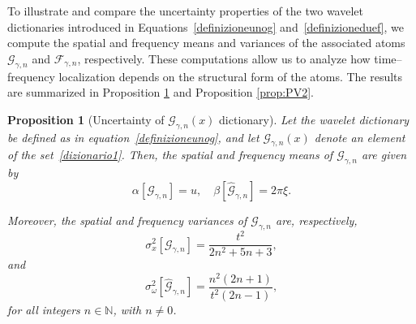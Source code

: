 \documentclass[preprint,hidelinks,authoryear]{elsarticle}
\newtheorem{Prop}[Thm]{Proposition}
\theoremstyle{plain}
\theoremstyle{definition}
\theoremstyle{remark}
\begin{document}
To illustrate and compare the uncertainty properties of the two wavelet dictionaries introduced in Equations~\eqref{definizioneunog} and~\eqref{definizioneduef}, we compute the spatial and frequency means and variances of the associated atoms $ \mathcal{G}_{\gamma,n} $ and $ \mathcal{F}_{\gamma,n} $, respectively. These computations allow us to analyze how time–frequency localization depends on the structural form of the atoms. The results are summarized in Proposition \ref{prop:PV} and Proposition \ref{prop:PV2}.
\begin{Prop}[Uncertainty of $ \mathcal{G}_{\gamma,n}(x) $ dictionary]
\label{prop:PV}
Let the wavelet dictionary be defined as in equation~\eqref{definizioneunog}, and let $ \mathcal{G}_{\gamma,n}(x) $ denote an element of the set~\eqref{dizionario1}. Then, the spatial and frequency means of $ \mathcal{G}_{\gamma,n} $ are given by
$$
\alpha[\mathcal{G}_{\gamma,n}] = u, \quad \beta[\hat{\mathcal{G}}_{\gamma,n}] = 2\pi\xi.
$$

Moreover, the spatial and frequency variances of $ \mathcal{G}_{\gamma,n} $ are, respectively,
$$
\sigma_x^2[\mathcal{G}_{\gamma,n}] = \frac{t^2}{2n^2 + 5n + 3},
$$
and
$$
\sigma_\omega^2[\hat{\mathcal{G}}_{\gamma,n}] = \frac{n^2 (2n + 1)}{t^2 (2n - 1)},
$$
for all integers $ n \in \mathbb{N} $, with $ n \ne 0 $.
\end{Prop}
\end{document}
